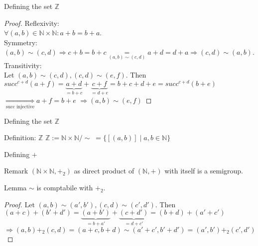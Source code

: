 \documentclass[aspectratio=169]{beamer}
\begin{document}
\begin{frame} {Defining the set $\mathbb{Z}$}
    \begin{proof}
        Reflexivity:\\ $\forall (a, b) \in \mathbb{N} \times \mathbb{N}: a+b = b+a$.\\
        Symmetry:\\ $(a, b) \sim (c, d) \Rightarrow c+b = b+c\underset{(a, b) \sim (c, d)}{=}a+d=d+a \Rightarrow (c, d) \sim (a, b)$.\\
        Transitivity: \\
        Let $(a, b) \sim (c, d), (c, d) \sim (e, f)$. Then \\
        $succ^{c+d}(a+f)= \underbrace{a+d}_{= b+c}+\underbrace{c+f}_{= d+e} = b+c+d+e=succ^{c+d}(b+e)$ \\
        $\underset{\text{succ injective}}{\Rightarrow} a+f=b+e$
        $\Rightarrow (a, b) \sim (e, f)$
    \end{proof}
\end{frame}

\begin{frame} {Defining the set $\mathbb{Z}$}
\begin{block}{Definition: $\mathbb{Z}$}
    $\mathbb{Z} :=  \mathbb{N} \times \mathbb{N} / \sim \;=  \{[(a, b)] \mid a,b \in \mathbb{N}\}$
\end{block}
\end{frame}

\begin{frame}{Defining $+$}
    \begin{block} {Remark}
        $(\mathbb{N} \times \mathbb{N}, +_2)$ as direct product of $(\mathbb{N}, +)$ with itself is a semigroup.
    \end{block}

    \begin{block} {Lemma}
        $\sim$ is comptabile with $+_2$.
    \end{block}

    \begin{proof}
        Let $(a, b) \sim (a', b'), (c, d) \sim (c', d')$. Then
        $(a+c) + (b'+d') = \underbrace{(a+b')}_{=b+a'} + \underbrace{(c+d')}_{=d+c'} = (b+d) + (a'+c')$ \\
        $\Rightarrow (a, b) +_2 (c, d) = (a+c, b+d) \sim (a'+c',b'+d') = (a', b') +_2 (c', d')$
    \end{proof}
\end{frame}
\end{document}
